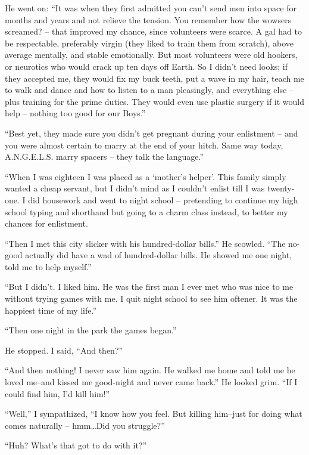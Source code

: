 He  went on: ``It was when they first admitted you can't
send men into space for months and years and  not  relieve  the
tension. You remember how the wowsers screamed? -- that improved
my  chance,  since  volunteers  were  scarce.  A gal had to be
respectable, preferably virgin (they liked to train  them  from
scratch),  above  average mentally, and stable emotionally. But
most volunteers were old hookers, or neurotics who would  crack
up ten days off Earth. So I didn't need looks; if they accepted
me, they would fix my buck teeth, put a wave in my hair, teach
me to walk and dance and how to listen to a man pleasingly, and
everything else -- plus training  for  the  prime  duties.  They
would  even  use plastic surgery if it would help -- nothing too
good for our Boys.''

``Best yet, they  made  sure  you  didn't  get  pregnant
during  your  enlistment -- and you were almost certain to marry
at the end of your hitch. Same way today, A.N.G.E.L.S.
marry spacers -- they talk the language.''

``When  I  was  eighteen  I  was  placed  as a `mother's
helper'. This family simply  wanted  a  cheap  servant,  but  I
didn't  mind  as I couldn't enlist till I was twenty-one. I did
housework and went to night school -- pretending to continue  my
high  school  typing  and  shorthand but going to a charm class
instead, to better my chances for enlistment.

``Then I met this city slicker with  his  hundred-dollar
bills.'' He scowled. ``The no-good actually did have a wad of
hundred-dollar bills. He showed me one night, told me  to  help
myself.''

``But I didn't. I liked him. He was the first man I ever
met who was  nice  to  me  without trying games with me. I quit
night school to see him oftener. It was the happiest time of my
life.''

``Then one night in the park the games began.''

He stopped. I said, ``And then?''

``And then nothing! I never saw him again. He walked  me
home and told me he loved me--and kissed me good-night and never
came  back.'' He looked grim. ``If I could find him, I'd kill
him!''

``Well,'' I sympathized,  ``I  know  how  you  feel.  But
killing  him--just  for  doing what comes naturally -- hmm\dots Did
you struggle?''

``Huh? What's that got to do with it?''

